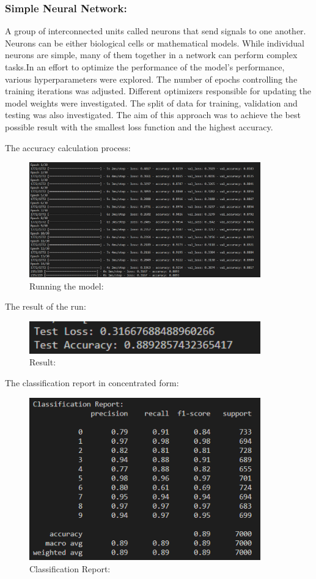 \documentclass{article}
\begin{document}
\subsubsection{Simple Neural Network:}
A group of interconnected units called neurons that send signals to one another. Neurons can be either biological cells or mathematical models. While individual neurons are simple, many of them together in a network can perform complex tasks.In an effort to optimize the performance of the model's performance, various hyperparameters were explored.
The number of epochs controlling the training iterations was adjusted. Different optimizers responsible for updating the model weights were investigated. The split of data for training, validation and testing was also investigated.
The aim of this approach was to achieve the best possible result with the smallest loss function and the highest accuracy.

The accuracy calculation process:

\begin{figure}[H]
    \caption{Running the model:}
    \centering
    \includegraphics[width=10cm]{imgFolder/RunningSimpleNeuralNetwork.png}
\end{figure}

The result of the run:
\begin{figure}[H]
    \caption{Result:}
    \centering
    \includegraphics[width=10cm]{imgFolder/simpleNeuralNetworkResult.png}
\end{figure}

The classification report in concentrated form:
\begin{figure}[H]
    \caption{Classification Report:}
    \centering
    \includegraphics[width=10cm]{imgFolder/classificationReportSimpleNeuralNetwork.png}
\end{figure}
\end{document}
